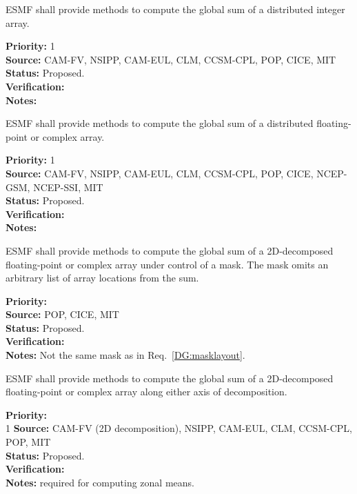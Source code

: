 ESMF shall provide methods to compute the global sum of a distributed
integer array.

\begin{reqlist}
{\bf Priority:} 1 \\ 
{\bf Source:} CAM-FV, NSIPP, CAM-EUL, CLM, CCSM-CPL, POP, CICE, MIT \\
{\bf Status:} Proposed. \\
{\bf Verification:} \\
{\bf Notes:} 
\end{reqlist}



ESMF shall provide methods to compute the global sum of a distributed
floating-point or complex array.

\begin{reqlist}
{\bf Priority:} 1 \\ 
{\bf Source:} CAM-FV, NSIPP, CAM-EUL, CLM, CCSM-CPL, POP, CICE, NCEP-GSM, NCEP-SSI, MIT \\
{\bf Status:} Proposed. \\
{\bf Verification:} \\
{\bf Notes:}
\end{reqlist}

 \label{DG:masksum}

ESMF shall provide methods to compute the global sum of a 2D-decomposed
floating-point or complex array under control of a mask. The mask
omits an arbitrary list of array locations from the sum.

\begin{reqlist}
{\bf Priority:} \\
{\bf Source:} POP, CICE, MIT \\
{\bf Status:} Proposed. \\
{\bf Verification:} \\
{\bf Notes:} Not the same mask as in Req.~\ref{DG:masklayout}.
\end{reqlist}


ESMF shall provide methods to compute the global sum of a 2D-decomposed
floating-point or complex array along either axis of decomposition.

\begin{reqlist}
{\bf Priority:} \\ 1
{\bf Source:} CAM-FV (2D decomposition), NSIPP, CAM-EUL, CLM, CCSM-CPL, POP, MIT \\
{\bf Status:} Proposed. \\
{\bf Verification:} \\
{\bf Notes:} required for computing zonal means.
\end{reqlist}

